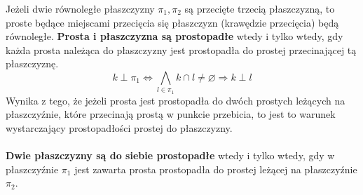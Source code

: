 \documentclass[14pt,a4paper]{extarticle}
\begin{document}
\hfill\break
\noindent Jeżeli dwie równoległe płaszczyzny $\pi_{1},\pi_{2}$ są przecięte trzecią płaszczyzną,
to proste będące miejscami przecięcia się płaszczyzn (krawędzie przecięcia) będą równoległe.
\MoveBelowBox
\noindent\textbf{Prosta i płaszczyzna są prostopadłe} wtedy i tylko wtedy, gdy każda prosta należąca
do płaszczyzny jest prostopadła do prostej przecinającej tą płaszczyznę.\\
$$k \perp \pi_{1} \Leftrightarrow \underset{l \in \pi_{1}}{\bigwedge}k \cap l \neq \varnothing \Rightarrow k \perp l $$
Wynika z tego, że jeżeli prosta jest prostopadła do dwóch prostych leżących na płaszczyźnie,
które przecinają prostą w punkcie przebicia, to jest to warunek wystarczający prostopadłości
prostej do płaszczyzny.\\\\
\noindent\textbf{Dwie płaszczyzny są do siebie prostopadłe} wtedy i tylko wtedy, gdy w płaszczyźnie
$\pi_{1}$ jest zawarta prosta prostopadła do prostej leżącej na płaszczyźnie $\pi_{2}$.
\end{document}
